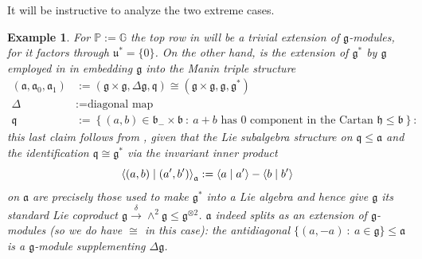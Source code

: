 \documentclass[11pt,leqno]{article}
\theoremstyle{plain}
\theoremstyle{plain}
\theoremstyle{plain}
\newtheorem{example}[lemma]{Example}
\numberwithin{equation}{section}
\theoremstyle{nonumberplain}
\newcommand\bG{{\mathbb G}}
\newcommand\bP{{\mathbb P}}
\newcommand\fa{{\mathfrak a}}
\newcommand\fb{{\mathfrak b}}
\newcommand\fg{{\mathfrak g}}
\newcommand\fh{{\mathfrak h}}
\newcommand\fq{{\mathfrak q}}
\newcommand\fu{{\mathfrak u}}
\newcommand\1{{\bf 1}}
\begin{document}
It will be instructive to analyze the two extreme cases.

\begin{example}\label{ex:pg}
  For $\bP:=\bG$ the top row in  will be a trivial extension of $\fg$-modules, for it factors through $\fu^*=\{0\}$. On the other hand,  is the extension of $\fg^*$ by $\fg$ employed in \cite[Example 1.3.8]{cp_qg} in embedding $\fg$ into the \emph{Manin triple} \cite[Definition 1.3.3]{cp_qg} structure
  \begin{equation*}
    \begin{aligned}
      (\fa,\fa_0,\fa_1)
      &:=\left(\fg\times \fg,\Delta\fg,\fq\right)
        \cong\left(\fg\times \fg,\fg,\fg^*\right)
      \\
      \Delta&:=\text{diagonal map}\\
      \fq&:=\left\{(a,b)\in \fb_-\times \fb\ :\ a+b\text{ has 0 component in the Cartan }\fh\le \fb\right\}:
    \end{aligned}
  \end{equation*}
  this last claim follows from , given that the Lie subalgebra structure on $\fq\le \fa$ and the identification $\fq\cong \fg^*$ via the invariant inner product
  \begin{equation*}
    \Braket{(a,b)\mid (a',b')}_{\fa}
    :=
    \Braket{a\mid a'}-\Braket{b\mid b'}
  \end{equation*}
  on $\fa$ are precisely those used to make $\fg^*$ into a Lie algebra and hence give $\fg$ its standard Lie coproduct $\fg\xrightarrow{\delta}\wedge^2 \fg\le \fg^{\otimes 2}$. $\fa$ indeed splits as an extension of $\fg$-modules (so we do have  $\cong$  in this case): the \emph{anti}diagonal $\{(a,-a)\ :\ a\in \fg\}\le \fa$ is a $\fg$-module supplementing $\Delta\fg$. 
\end{example}
\end{document}
